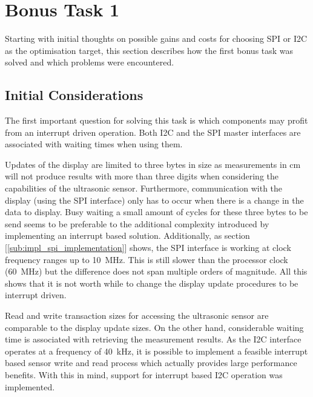 
	\section{Bonus Task 1} %
	\label{sec:impl_bonus_task_1}
		Starting with initial thoughts on possible gains and costs for choosing SPI or I2C as the optimisation target, this section describes how the first bonus task was solved and which problems were encountered.

		\subsection{Initial Considerations} %
		\label{sub:initial_considerations}
			The first important question for solving this task is which components may profit from an interrupt driven operation. Both I2C and the SPI master interfaces are associated with waiting times when using them. 

			Updates of the display are limited to three bytes in size as measurements in cm will not produce results with more than three digits when considering the capabilities of the ultrasonic sensor. Furthermore, communication with the display (using the SPI interface) only has to occur when there is a change in the data to display. Busy waiting a small amount of cycles for these three bytes to be send seems to be preferable to the additional complexity introduced by implementing an interrupt based solution. Additionally, as section [\ref{sub:impl_spi_implementation}] shows, the SPI interface is working at clock frequency ranges up to \SI{10}{\mega\hertz}. This is still slower than the processor clock (\SI{60}{\mega\hertz}) but the difference does not span multiple orders of magnitude. 
			All this shows that it is not worth while to change the display update procedures to be interrupt driven.

			Read and write transaction sizes for accessing the ultrasonic sensor are comparable to the display update sizes. On the other hand, considerable waiting time is associated with retrieving the measurement results. As the I2C interface operates at a frequency of \SI{40}{\kilo\hertz}, it is possible to implement a feasible interrupt based sensor write and read process which actually provides large performance benefits. With this in mind, support for interrupt based I2C operation was implemented.

